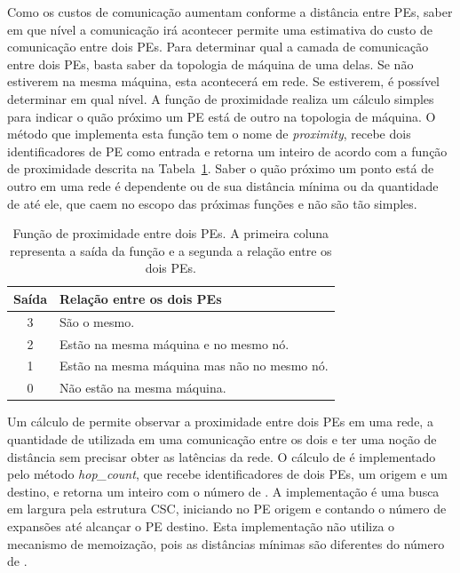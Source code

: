 Como os custos de comunicação aumentam conforme a distância entre PEs, saber em que nível a comunicação irá acontecer permite uma estimativa do custo de comunicação entre dois PEs.
Para determinar qual a camada de comunicação entre dois PEs, basta saber da topologia de máquina de uma delas. 
Se não estiverem na mesma máquina, esta acontecerá em rede. 
Se estiverem, é possível determinar em qual nível.
A função de proximidade realiza um cálculo simples para indicar o quão próximo um PE está de outro na topologia de máquina.
O método que implementa esta função tem o nome de \textit{proximity}, recebe dois identificadores de PE como entrada e retorna um inteiro de acordo com a função de proximidade descrita na Tabela~\ref{tab:proximity}.
Saber o quão próximo um ponto está de outro em uma rede é dependente ou de sua distância mínima ou da quantidade de \hops até ele, que caem no escopo das próximas funções e não são tão simples.


\setlength{\tabcolsep}{0.5em}
\begin{table}[!ht]
    \centering
    \begin{tabular}{c l}
        \toprule
        \textbf{Saída} &    \textbf{Relação entre os dois PEs} \\ \midrule
        3 & São o mesmo.   \\ %
        2 & Estão na mesma máquina e no mesmo nó.   \\ %
        1 & Estão na mesma máquina mas não no mesmo nó.   \\ %
        0 & Não estão na mesma máquina. \\ \bottomrule
    \end{tabular}
    \caption[Função de proximidade]{Função de proximidade entre dois PEs. A primeira coluna representa a saída da função e a segunda a relação entre os dois PEs.}
    \label{tab:proximity}
\end{table}

Um cálculo de \hops permite observar a proximidade entre dois PEs em uma rede, a quantidade de \links utilizada em uma comunicação entre os dois e ter uma noção de distância sem precisar obter as latências da rede.
O cálculo de \hops é implementado pelo método \textit{hop\_count}, que recebe identificadores de dois PEs, um origem e um destino, e retorna um inteiro com o número de \hops.
A implementação é uma busca em largura pela estrutura CSC, iniciando no PE origem e contando o número de expansões até alcançar o PE destino.
Esta implementação não utiliza o mecanismo de memoização, pois as distâncias mínimas são diferentes do número de \hops.


